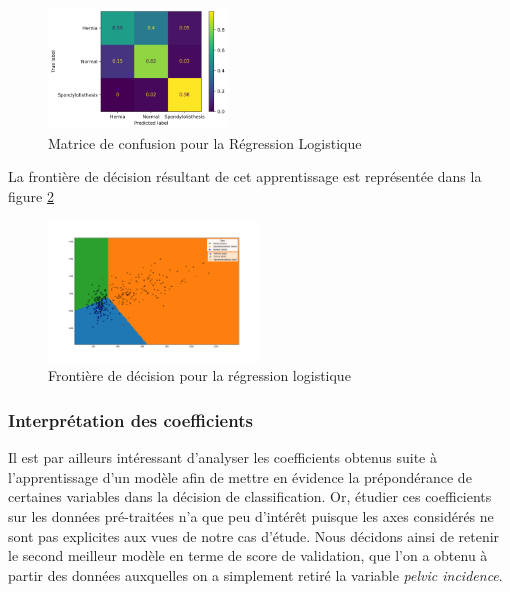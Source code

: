 \documentclass[twocolumn,10pt]{article}
\begin{document}
\begin{figure}[htbp]
    \begin{center}
        \includegraphics[width=0.425\textwidth]{figures/confusion_matrix_Logistic_Regression.png}
        \caption{\label{fig:confusion_matrix_LR}Matrice de confusion pour la Régression Logistique}
    \end{center}
\end{figure}

La frontière de décision résultant de cet apprentissage est représentée dans la figure \ref{fig:decision_boundary_LR}

\begin{figure}[htbp]
    \begin{center}
        \includegraphics[width=0.5\textwidth]{figures/Decision_boundary_Logistic_Regression.png}
        \caption{\label{fig:decision_boundary_LR}Frontière de décision pour la régression logistique}
    \end{center}
\end{figure}


\subsubsection{Interprétation des coefficients}

Il est par ailleurs intéressant d'analyser les coefficients obtenus suite à l'apprentissage d'un modèle afin de mettre en évidence la prépondérance de certaines variables dans la décision de classification. Or, étudier ces coefficients sur les données pré-traitées n'a que peu d'intérêt puisque les axes considérés ne sont pas explicites aux vues de notre cas d'étude. Nous décidons ainsi de retenir le second meilleur modèle en terme de score de validation, que l'on a obtenu à partir des données auxquelles on a simplement retiré la variable \textit{pelvic incidence}.
\end{document}
